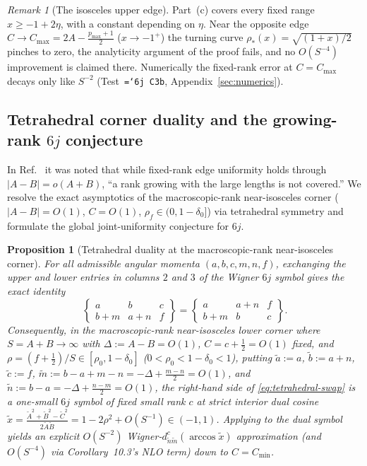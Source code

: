 \documentclass[11pt]{article}
\newtheorem{proposition}[theorem]{Proposition}
\theoremstyle{definition}
\theoremstyle{remark}
\newtheorem{remark}[theorem]{Remark}
\newcommand{\sixj}[6]{\begin{Bmatrix}#1&#2&#3\\#4&#5&#6\end{Bmatrix}}
\renewcommand{\_}{\oldunderscore\penalty0\hskip0pt\relax}
\let\oldtexttt\texttt
\renewcommand{\texttt}[1]{\oldtexttt{\hyphenchar\font=`\-\relax #1}}
\begin{document}
\begin{remark}[The isosceles upper edge]
\label{rem:isosceles-upper-edge}
Part~(c) covers every fixed range $x\ge -1+2\eta$, with a constant depending on $\eta$. Near the opposite edge
  $C\to C_{\max}=2A-\frac{p_{\max}+1}{2}$ ($x\to -1^+$) the
  turning curve $\rho_*(x)=\sqrt{(1+x)/2}$ pinches to zero, the analyticity argument of the proof fails, and no $O(S^{-4})$
  improvement is claimed there. Numerically the fixed-rank error at $C=C_{\max}$ decays only like $S^{-2}$ (Test~\texttt{6j~C3b},
  Appendix~\ref{sec:numerics}).
\end{remark}

\subsection{Tetrahedral corner duality and the growing-rank \texorpdfstring{$6j$}{6j} conjecture}
In Ref.~\cite[Section~10, the remark ``The lower corner'' following Corollary~10.5]{LewisFixedRank} it
  was noted that while fixed-rank edge uniformity holds through $|A-B|=o(A+B)$, ``a rank growing with the large lengths is not
  covered.'' We resolve the exact asymptotics of the macroscopic-rank near-isosceles corner ($|A-B|=O(1)$, $C=O(1)$,
  $\rho_f\in(0,1-\delta_0]$) via tetrahedral symmetry and formulate the global joint-uniformity conjecture for $6j$.

\begin{proposition}[Tetrahedral duality at the macroscopic-rank near-isosceles corner]
\label{prop:tetrahedral-corner}
For all admissible angular momenta $(a,b,c,m,n,f)$, exchanging the upper and lower entries in columns $2$ and $3$ of the Wigner $6j$ symbol gives the exact identity
\begin{equation}
  \sixj{a}{b}{c}{b+m}{a+n}{f} = \sixj{a}{a+n}{f}{b+m}{b}{c}.
  \label{eq:tetrahedral-swap}
\end{equation}
Consequently, in the macroscopic-rank near-isosceles lower corner where $S=A+B\to\infty$ with $\Delta:=A-B=O(1)$,
  $C=c+\frac12=O(1)$ fixed, and $\rho=(f+\frac12)/S\in[\rho_0,1-\delta_0]$ ($0<\rho_0<1-\delta_0<1$), putting $\tilde{a}:=a$,
  $\tilde{b}:=a+n$, $\tilde{c}:=f$, $\tilde{m}:=b-a+m-n=-\Delta+\frac{m-n}{2}=O(1)$, and
  $\tilde{n}:=b-a=-\Delta+\frac{n-m}{2}=O(1)$, the right-hand side of \eqref{eq:tetrahedral-swap} is a one-small $6j$ symbol of
  \emph{fixed small rank $c$} at strict interior dual cosine
  $\tilde{x}=\frac{\tilde{A}^2+\tilde{B}^2-\tilde{C}^2}{2\tilde{A}\tilde{B}}=1-2\rho^2+O(S^{-1})\in(-1,1)$. Applying
  \cite[Corollary~10.3]{LewisFixedRank} to the dual symbol yields an explicit $O(S^{-2})$ Wigner-$d^c_{\tilde{n}\tilde{m}}(\arccos\tilde{x})$
  approximation (and $O(S^{-4})$ via Corollary~10.3's NLO term) down to $C=C_{\min}$.
\end{proposition}
\end{document}
